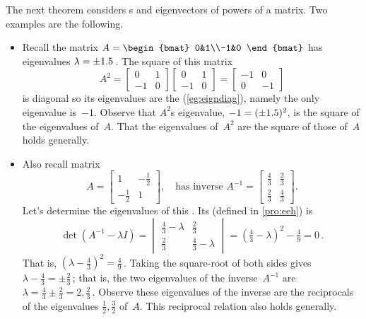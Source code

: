 \begin{example}
\begin{itemize}
\end{itemize}
\end{example}



\begin{example} \label{eg:2x2powmat}
The next theorem considers s and eigenvectors of powers of a matrix.  
Two examples are the following.
\begin{itemize}
\item Recall the matrix \(A=\begin{bmat} 0&1\\-1&0 \end{bmat}\) has eigenvalues \(\lambda=\pm 1.5\)\,.  The square of this matrix
\begin{equation*}
A^2=\begin{bmatrix} 0&1\\-1&0 \end{bmatrix}\begin{bmatrix} 0&1\\-1&0 \end{bmatrix}
=\begin{bmatrix} -1&0\\0&-1 \end{bmatrix}
\end{equation*}
is diagonal so its eigenvalues are the  (\autoref{eg:eigndiag}), namely the only eigenvalue is~\(-1\).
Observe that \(A^2\)s eigenvalue, \(-1=(\pm 1.5)^2\), is the square of the eigenvalues of~\(A\).
That the eigenvalues of~\(A^2\) are the square of those of~\(A\) holds generally.

\item Also recall matrix 
\begin{equation*}
A=\begin{bmatrix} 1&-\frac12\\-\frac12&1 \end{bmatrix},
\quad\text{has inverse }A^{-1}=\begin{bmatrix} \frac43&\frac23\\\frac23&\frac43 \end{bmatrix}.
\end{equation*}
Let's determine the eigenvalues of this .
Its  (defined in \autoref{pro:eeh}) is
\begin{equation*}
\det(A^{-1}-\lambda I)
=\begin{vmatrix} \frac43-\lambda&\frac23\\\frac23&\frac43-\lambda \end{vmatrix}
=(\tfrac43-\lambda)^2-\tfrac49=0\,.
\end{equation*}
That is, \((\lambda-\tfrac43)^2=\tfrac49\)\,.
Taking the square-root of both sides gives \(\lambda-\tfrac43=\pm\tfrac23\)\,; that is, the two eigenvalues of the inverse~\(A^{-1}\) are \(\lambda=\tfrac43\pm\tfrac23=2,\tfrac23\)\,.
Observe these eigenvalues of the inverse are the reciprocals of the eigenvalues \(\frac12,\frac32\) of~\(A\).
This reciprocal relation also holds generally.


\end{itemize}
\end{example}
